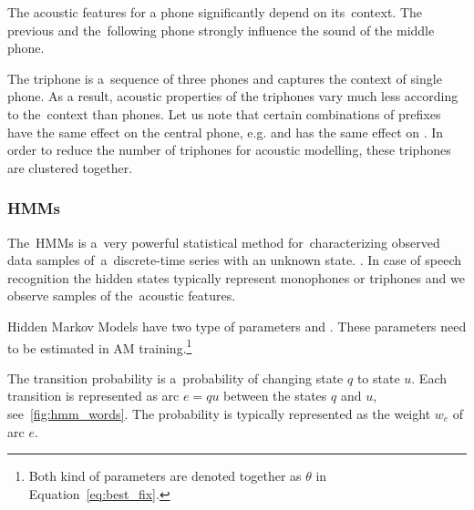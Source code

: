The acoustic features for a phone significantly depend on its~context.
The previous and the~following phone strongly influence the sound of the middle phone.

The triphone is a~sequence of three phones and captures the context of single phone.
As a result, acoustic properties of the triphones vary much less according to the~context than phones.
Let us note that certain combinations of prefixes have the same effect on the central phone,
e.g.  and  has the same effect on . %
In order to reduce the number of triphones for acoustic modelling, these triphones are clustered together.



%     
%     

\subsubsection*{\acfp{HMM}}
The~\acp{HMM} is a~very powerful statistical method for~characterizing observed data samples of~a~discrete-time series with an unknown state. \cite{huang2001spoken}. %
In case of speech recognition the hidden states typically represent monophones or triphones and we observe samples of the~acoustic features.

Hidden Markov Models have two type of parameters  and .
These parameters need to be estimated in \ac{AM} training.\footnote{Both kind of parameters are denoted together as $\theta$ in Equation~\ref{eq:best_fix}.}

The transition probability is a~probability of changing state $q$ to state $u$.
Each transition is represented as arc $e=qu$ between the states $q$ and $u$, see~\ref{fig:hmm_words}.
The probability is typically represented as the weight $w_e$ of arc $e$.

